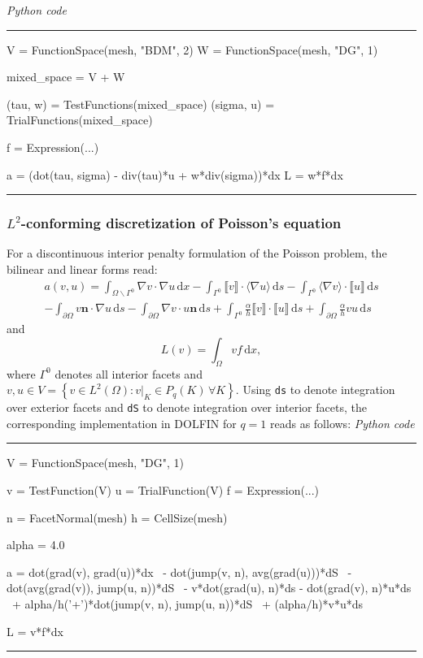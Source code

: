 \documentclass[acmtoms]{acmtrans2m}
\newenvironment{pythoncode}[1]{\center\minipage{#1\textwidth}\footnotesize\hfill\it Python code \rm\vspace{0.1cm}\hrule\renewcommand{\baselinestretch}{0.9}\footnotesize\verbatim}{\endverbatim\hrule\normalsize\endminipage\newline\endcenter}
\newcommand{\vect}[1]{\boldsymbol{#1}}
\newcommand{\brac}[1]{\left( {#1} \right)}
\newcommand{\bracc}[1]{\left\{ {#1} \right\}}
\newcommand{\jump}[1]{\llbracket {#1} \rrbracket}
\newcommand{\avg}[1]{\langle {#1} \rangle}
\newcommand{\dx}{\,\mathrm{d}x}
\newcommand{\ds}{\,\mathrm{d}s}
\newcommand{\dolfin}{DOLFIN}
\begin{document}
\begin{pythoncode}{0.9}
V = FunctionSpace(mesh, "BDM", 2)
W = FunctionSpace(mesh, "DG", 1)

mixed_space = V + W

(tau, w)   = TestFunctions(mixed_space)
(sigma, u) = TrialFunctions(mixed_space)

f = Expression(...)

a = (dot(tau, sigma) - div(tau)*u + w*div(sigma))*dx
L = w*f*dx
\end{pythoncode}

\subsubsection{$L^2$-conforming discretization of Poisson's equation}

For a discontinuous interior penalty formulation of the Poisson problem,
the bilinear and linear forms read:
\begin{multline}
  a(v,u) =
    \int_{\Omega \backslash \Gamma^{0}}\nabla v \cdot \nabla u \dx
  - \int_{\Gamma^{0}} \jump{v} \cdot \avg{\nabla u}  \ds
  - \int_{\Gamma^{0}} \avg{\nabla v} \cdot \jump{u}  \ds
\\
  - \int_{\partial\Omega} v \vect{n} \cdot \nabla u  \ds
  - \int_{\partial\Omega} \nabla v \cdot u \vect{n}  \ds
  + \int_{\Gamma^{0}} \frac{\alpha}{h} \jump{v} \cdot \jump{u}  \ds
  + \int_{\partial\Omega} \frac{\alpha}{h} v u  \ds
\label{eq:poisson_dg_bilinear}
\end{multline}
and
\begin{equation}
  L(v) = \int_{\Omega} v f  \dx,
\label{eq:poisson_dg_linear}
\end{equation}
where $\Gamma^{0}$ denotes all interior facets and $v, u \in V =
\bracc{v \in L^{2}\brac{\Omega}: v|_{K} \in P_q\brac{K} \,
  \forall K}$.  Using {\tt ds} to denote integration over exterior
facets and {\tt dS} to denote integration over interior facets,
the corresponding implementation in \dolfin{}
for $q = 1$ reads as follows:
\begin{pythoncode}{0.9}
V = FunctionSpace(mesh, "DG", 1)

v = TestFunction(V)
u = TrialFunction(V)
f = Expression(...)

n = FacetNormal(mesh)
h = CellSize(mesh)

alpha = 4.0

a =   dot(grad(v), grad(u))*dx \
    - dot(jump(v, n), avg(grad(u)))*dS \
    - dot(avg(grad(v)), jump(u, n))*dS \
    - v*dot(grad(u), n)*ds - dot(grad(v), n)*u*ds \
    + alpha/h('+')*dot(jump(v, n), jump(u, n))*dS \
    + (alpha/h)*v*u*ds

L = v*f*dx
\end{pythoncode}
\end{document}
